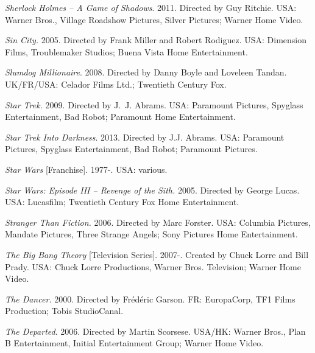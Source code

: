 \medskip\noindent\textit{Sherlock Holmes – A Game of Shadows}. 2011. Directed by Guy Ritchie. USA: Warner Bros., Village Roadshow Pictures, Silver Pictures; Warner Home Video.



\medskip\noindent\textit{Sin City.} 2005. Directed by Frank Miller and Robert Rodiguez. USA: Dimension Films, Troublemaker Studios; Buena Vista Home Entertainment.



\medskip\noindent\textit{Slumdog Millionaire}. 2008. Directed by Danny Boyle and Loveleen Tandan. UK/FR/USA: Celador Films Ltd.; Twentieth Century Fox.



\medskip\noindent\textit{Star Trek.} 2009. Directed by J.~J. Abrams. USA: Paramount Pictures, Spyglass Entertainment, Bad Robot; Paramount Home Entertainment.



\medskip\noindent\textit{Star Trek Into Darkness}. 2013. Directed by J.J. Abrams. USA: Paramount Pictures, Spyglass Entertainment, Bad Robot; Paramount Pictures.



\medskip\noindent\textit{Star Wars} [Franchise]. 1977-. USA: various.



\medskip\noindent\textit{Star Wars: Episode III – Revenge of the Sith.} 2005. Directed by George Lucas. USA: Lucasfilm; Twentieth Century Fox Home Entertainment.



\medskip\noindent\textit{Stranger Than Fiction.} 2006. Directed by Marc Forster. USA: Columbia Pictures, Mandate Pictures, Three Strange Angels; Sony Pictures Home Entertainment.



\medskip\noindent\textit{The Big Bang Theory} [Television Series]. 2007-. Created by Chuck Lorre and Bill Prady. USA: Chuck Lorre Productions, Warner Bros. Television; Warner Home Video.



\medskip\noindent\textit{The Dancer.} 2000. Directed by Frédéric Garson. FR: EuropaCorp, TF1 Films Production; Tobis StudioCanal.



\medskip\noindent\textit{The Departed}. 2006. Directed by Martin Scorsese. USA/HK: Warner Bros., Plan B Entertainment, Initial Entertainment Group; Warner Home Video.



